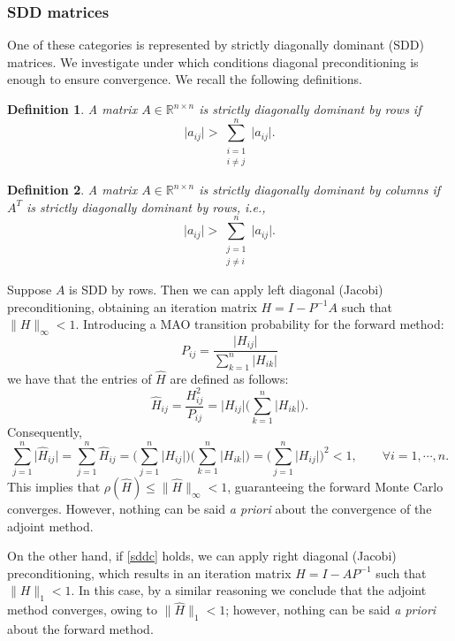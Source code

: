 \documentclass[final,leqno,onefignum,onetabnum]{siamltex1213}
\newtheorem{defn}{Definition}
\begin{document}
\subsubsection{SDD matrices}
\label{sec:sdd}

One of these categories is represented by strictly diagonally dominant 
(SDD) matrices. We investigate under which conditions diagonal preconditioning
is enough to ensure convergence.
We recall the following definitions.

\begin{defn}
 A matrix $A\in\mathbb{R}^{n\times n}$ is strictly diagonally dominant 
by rows if
 \begin{equation}
    \lvert a_{ij}\rvert>\sum_{\substack{i=1\\ i\ne j}}^{n}\lvert
a_{ij}\rvert .
\label{sddr}
 \end{equation}
\end{defn}

\begin{defn}
 A matrix $A\in\mathbb{R}^{n\times n}$ is strictly diagonally dominant
by columns if $A^T$ is strictly diagonally dominant by rows, i.e., 
 \begin{equation}
    \lvert a_{ij}\rvert>\sum_{\substack{j=1\\ j\ne i}}^{n}\lvert
a_{ij}\rvert .
\label{sddc}
 \end{equation}
\end{defn}

Suppose $A$ is SDD by rows. Then we can apply left diagonal (Jacobi) preconditioning, 
obtaining an iteration matrix $H=I-P^{-1}A$ such that $\lVert H 
\rVert_{\infty}<1$.
Introducing a MAO transition probability for the forward method: 
\[
 P_{ij}=\frac{\lvert H_{ij}\rvert}{\sum_{k=1}^n\lvert H_{ik}\rvert} 
\]
we have that the entries of $\hat{H}$ are defined as follows:
\[
 \hat{H}_{ij}=\frac{H^2_{ij}}{P_{ij}}=\lvert H_{ij}\rvert\bigg
(\sum_{k=1}^n\lvert
H_{ik}\rvert\bigg ).
\]
Consequently,
\[
 \sum_{j=1}^n\lvert \hat{H}_{ij} \rvert = \sum_{j=1}^n \hat{H}_{ij} =\bigg
(\sum_{j=1}^n \lvert H_{ij}\rvert\bigg )\bigg (\sum_{k=1}^n\lvert
H_{ik}\rvert\bigg ) =\bigg
(\sum_{j=1}^n \lvert H_{ij}\rvert\bigg ) ^2 <1, \qquad \forall i=1,\cdots, n.
\]
This implies that $\rho(\hat{H})\le \lVert
\hat{H}\rVert_{\infty}<1$, guaranteeing the forward Monte Carlo converges.
However, nothing can be said {\em a priori}
about the convergence of the adjoint method.

On the other hand, if \eqref{sddc} holds, we can apply right diagonal 
(Jacobi) preconditioning, which
results in an iteration matrix $H=I-AP^{-1}$ such that $\lVert H 
\rVert_{1}<1$.
In this case, by a similar reasoning we
conclude that the adjoint method converges, owing to $\lVert
\hat{H}\rVert_1<1$; however,
nothing can be said \textit{a priori} about the forward method.
\end{document}
